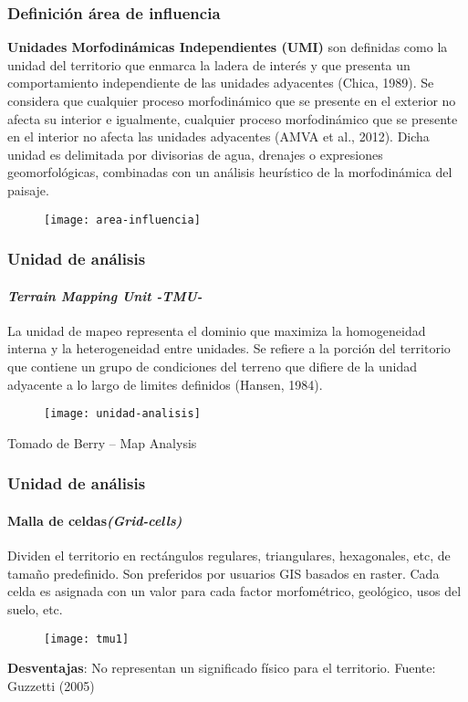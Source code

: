 \documentclass[12pt]{beamer}
\begin{document}
\begin{frame}
\frametitle{Definición área de influencia}
\scriptsize{
\textbf{Unidades Morfodinámicas Independientes (UMI) }son definidas como la unidad del territorio que enmarca la ladera de interés y que presenta un comportamiento independiente de las unidades adyacentes (Chica, 1989). Se considera que cualquier proceso morfodinámico que se presente en el exterior no afecta su interior e igualmente, cualquier proceso morfodinámico que se presente en el interior no afecta las unidades adyacentes (AMVA et al., 2012). Dicha unidad es delimitada por divisorias de agua, drenajes o expresiones geomorfológicas, combinadas con un análisis heurístico de la morfodinámica del paisaje. 
}
\begin{figure}
\centering
\texttt{[image: area-influencia]} 
\end{figure}
\end{frame}
\begin{frame}
\frametitle{Unidad de análisis}
\framesubtitle{\emph{Terrain Mapping Unit -TMU-}}
\scriptsize{
La unidad de mapeo representa el dominio que maximiza la homogeneidad interna y la heterogeneidad entre unidades. Se refiere a la porción del territorio que contiene un grupo de condiciones del terreno que difiere de la unidad adyacente a lo largo de limites definidos (Hansen, 1984).
 
}
\begin{figure}
\centering
\texttt{[image: unidad-analisis]} 
\end{figure}
\tiny{Tomado de Berry – Map Analysis}
\end{frame}
\begin{frame}
\frametitle{Unidad de análisis}
\framesubtitle{Malla de celdas\emph{(Grid-cells)}}
\scriptsize{
Dividen el territorio en rectángulos regulares, triangulares, hexagonales, etc, de tamaño predefinido. Son preferidos por usuarios GIS basados en raster. Cada celda es asignada con un valor para cada factor morfométrico, geológico, usos del suelo, etc. 
}
\begin{figure}
\centering
\texttt{[image: tmu1]} 
\end{figure}
\scriptsize{\textbf{Desventajas}: No representan un significado físico para el territorio.}
\vfill
\tiny{Fuente: Guzzetti (2005)}
\end{frame}
\end{document}
